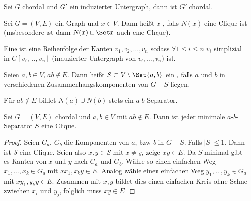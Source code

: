 \begin{lem}
    Sei $G$ chordal und $G'$ ein induzierter Untergraph, dann ist $G'$ chordal.
\end{lem}

\begin{df}
    Sei $G = (V, E)$ ein Graph und $x \in V$.
    Dann heißt $x$ , falls $N(x)$ eine Clique ist
    (insbesondere ist dann $N(x) \sqcup \Set x$ auch eine Clique).

    Eine  ist eine Reihenfolge der Kanten $v_1, v_2, \dotsc, v_n$ sodass
    $\forall 1 \le i \le n$ $v_i$ simplizial in $G[v_i, \dotsc, v_n]$ (induzierter Untergraph von $v_i, \dotsc, v_n$) ist.
\end{df}

\begin{df}
    Seien $a, b \in V$, $ab \not\in E$.
    Dann heißt $S \subset V \setminus \Set{a,b}$ ein , falls $a$ und $b$ in verschiedenen Zusammenhangskomponenten von $G - S$ liegen.
    \begin{note}
        Für $ab \not\in E$ bildet
        $N(a) \cup N(b)$ stets ein $a$-$b$-Separator.
    \end{note}
\end{df}

\begin{st}
    Sei $G = (V, E)$ chordal und $a, b \in V$ mit $ab \not\in E$.
    Dann ist jeder minimale $a$-$b$-Separator $S$ eine Clique.
    \begin{proof}
        Seien $G_a$, $G_b$ die Komponenten von $a$, bzw $b$ in $G - S$.
        Falls $|S| \le 1$.
        Dann ist $S$ eine Clique.
        Seien also $x, y \in S$ mit $x \neq y$, zeige $xy \in E$.
        Da $S$ minimal gibt es Kanten von $x$ und $y$ nach $G_a$ und $G_b$.
        Wähle so einen einfachen Weg $x_1, \dotsc, x_k \in G_a$ mit $xx_1, x_ky \in E$.
        Analog wähle einen einfachen Weg $y_1, \dotsc, y_k \in G_a$ mit $xy_1, y_ky \in E$.
        Zusammen mit $x,y$ bildet dies einen einfachen Kreis ohne Sehne zwischen $x_i$ und $y_j$, folglich muss $xy \in E$.
    \end{proof}
\end{st}


